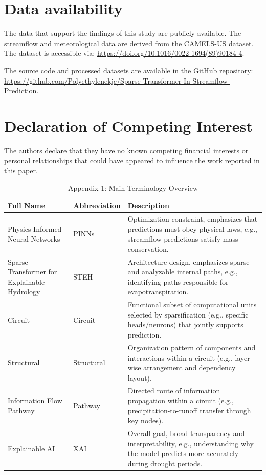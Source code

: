%

\section*{Data availability}

The data that support the findings of this study are publicly available. The streamflow and meteorological data are derived from the CAMELS-US dataset\cite{CAMELS}. The dataset is accessible via: \href{https://doi.org/10.1016/0022-1694(89)90184-4}{https://doi.org/10.1016/0022-1694(89)90184-4}. 

The source code and processed datasets are available in the GitHub repository: \href{https://github.com/Polyethylenekjc/Sparse-Transformer-In-Streamflow-Prediction}{https://github.com/Polyethylenekjc/Sparse-Transformer-In-Streamflow-Prediction}.

\section*{Declaration of Competing Interest}

The authors declare that they have no known competing financial interests or personal relationships that could have appeared to influence the work reported in this paper.

\begin{table}[htbp]
\centering
\caption{Appendix 1: Main Terminology Overview}
\label{tab:terminology_overview}
\begin{tabularx}{\textwidth}{p{3cm} p{2cm} X}
\toprule
\textbf{Full Name} & \textbf{Abbreviation} & \textbf{Description} \\
\midrule
Physics-Informed Neural Networks & PINNs & Optimization constraint, emphasizes that predictions must obey physical laws, e.g., streamflow predictions satisfy mass conservation. \\
Sparse Transformer for Explainable Hydrology & STEH & Architecture design, emphasizes sparse and analyzable internal paths, e.g., identifying paths responsible for evapotranspiration. \\
Circuit & Circuit & Functional subset of computational units selected by sparsification (e.g., specific heads/neurons) that jointly supports prediction. \\
Structural & Structural & Organization pattern of components and interactions within a circuit (e.g., layer-wise arrangement and dependency layout). \\
Information Flow Pathway & Pathway & Directed route of information propagation within a circuit (e.g., precipitation-to-runoff transfer through key nodes). \\
Explainable AI & XAI & Overall goal, broad transparency and interpretability, e.g., understanding why the model predicts more accurately during drought periods. \\
\bottomrule
\end{tabularx}
\end{table}

